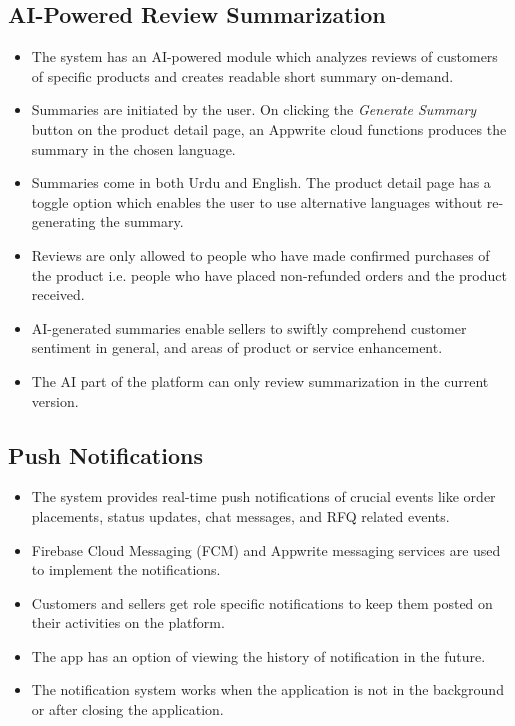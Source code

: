 \subsection{AI-Powered Review Summarization}
\begin{itemize}
    \item The system has an AI-powered module which analyzes reviews of customers of specific products and creates readable short summary on-demand.
    
    \item Summaries are initiated by the user. On clicking the \textit{Generate Summary} button on the product detail page, an Appwrite cloud functions produces the summary in the chosen language.
    
    \item Summaries come in both Urdu and English. The product detail page has a toggle option which enables the user to use alternative languages without re-generating the summary.
    
    \item Reviews are only allowed to people who have made confirmed purchases of the product i.e. people who have placed non-refunded orders and the product received.
    
    \item AI-generated summaries enable sellers to swiftly comprehend customer sentiment in general, and areas of product or service enhancement.
    
    \item The AI part of the platform can only review summarization in the current version.
\end{itemize}

\subsection{Push Notifications}
\begin{itemize}
    \item The system provides real-time push notifications of crucial events like order placements, status updates, chat messages, and RFQ related events.
    
    \item Firebase Cloud Messaging (FCM) and Appwrite messaging services are used to implement the notifications.
    
    \item Customers and sellers get role specific notifications to keep them posted on their activities on the platform.
    
    \item The app has an option of viewing the history of notification in the future.
    
    \item The notification system works when the application is not in the background or after closing the application.
\end{itemize}

